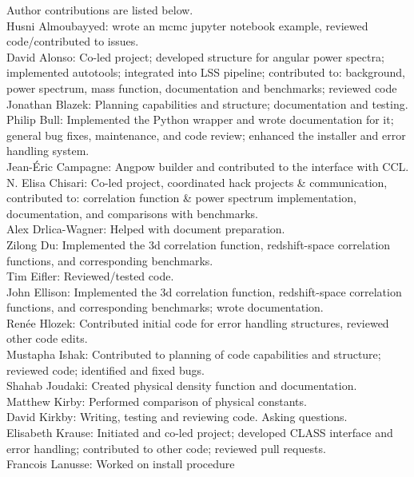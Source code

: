 Author contributions are listed below. \\
Husni Almoubayyed: wrote an mcmc jupyter notebook example, reviewed code/contributed to issues. \\
David Alonso: Co-led project; developed structure for angular power spectra; implemented autotools; integrated into LSS pipeline; contributed to: background, power spectrum, mass function, documentation and benchmarks; reviewed code \\
Jonathan Blazek: Planning capabilities and structure; documentation and testing. \\
Philip Bull: Implemented the Python wrapper and wrote documentation for it; general bug fixes, maintenance, and code review; enhanced the installer and error handling system. \\
Jean-\'Eric Campagne: Angpow builder and contributed to the interface with CCL. \\
N. Elisa Chisari: Co-led project, coordinated hack projects \& communication, contributed to: correlation function \& power spectrum implementation, documentation, and comparisons with benchmarks. \\
Alex Drlica-Wagner: Helped with document preparation. \\
Zilong Du: Implemented the 3d correlation function, redshift-space correlation functions, and corresponding benchmarks. \\
Tim Eifler: Reviewed/tested code. \\
John Ellison: Implemented the 3d correlation function, redshift-space correlation functions, and corresponding benchmarks; wrote documentation. \\
Ren\'ee Hlozek: Contributed initial code for error handling structures, reviewed other code edits. \\
Mustapha Ishak: Contributed to planning of code capabilities and structure; reviewed code; identified and fixed bugs. \\
Shahab Joudaki: Created physical density function and documentation. \\
Matthew Kirby: Performed comparison of physical constants. \\
David Kirkby: Writing, testing and reviewing code. Asking questions. \\
Elisabeth Krause: Initiated and co-led project; developed CLASS interface and error handling; contributed to other code; reviewed pull requests. \\
Francois Lanusse: Worked on install procedure \\
